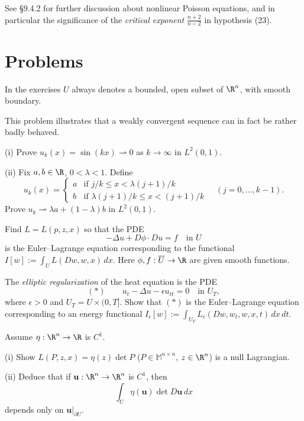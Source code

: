 See \S9.4.2 for further discussion about nonlinear Poisson equations, and in particular the significance of the \textit{critical exponent} $\frac{n+2}{n-2}$ in hypothesis (23).

\section{Problems}
\label{sec:calculus-of-variations-problems}

In the exercises $U$ always denotes a bounded, open subset of $\R^n$, with smooth boundary.

\begin{exercise}
This problem illustrates that a weakly convergent sequence can in fact be rather badly behaved.

(i) Prove $u_k(x) = \sin(kx) \rightharpoonup 0$ as $k \to \infty$ in $L^2(0,1)$.

(ii) Fix $a, b \in \R$, $0 < \lambda < 1$. Define
\[
u_k(x) = \begin{cases} a & \text{if } j/k \le x < \lambda(j+1)/k \\ b & \text{if } \lambda(j+1)/k \le x < (j+1)/k \end{cases} \quad (j = 0, \ldots, k-1).
\]
Prove $u_k \rightharpoonup \lambda a + (1-\lambda)b$ in $L^2(0,1)$.
\end{exercise}

\begin{exercise}
Find $L = L(p, z, x)$ so that the PDE
\[
-\Delta u + D\phi \cdot Du = f \quad \text{in } U
\]
is the Euler--Lagrange equation corresponding to the functional $I[w] := \int_U L(Dw, w, x)\, dx$. Here $\phi, f : \overline{U} \to \R$ are given smooth functions.
\end{exercise}

\begin{exercise}
The \textit{elliptic regularization} of the heat equation is the PDE
\[
(*) \qquad u_t - \Delta u - \epsilon u_{tt} = 0 \quad \text{in } U_T,
\]
where $\epsilon > 0$ and $U_T = U \times (0, T]$. Show that $(*)$ is the Euler--Lagrange equation corresponding to an energy functional $I_\epsilon[w] := \int_{U_T} L_\epsilon(Dw, w_t, w, x, t)\, dx\, dt$.
\end{exercise}

\begin{exercise}
Assume $\eta : \R^n \to \R$ is $C^1$.

(i) Show $L(P, z, x) = \eta(z) \det P$ ($P \in \mathbb{M}^{n \times n}$, $z \in \R^n$) is a null Lagrangian.

(ii) Deduce that if $\mathbf{u} : \R^n \to \R^n$ is $C^1$, then
\[
\int_U \eta(\mathbf{u}) \det D\mathbf{u}\, dx
\]
depends only on $\mathbf{u}|_{\partial U}$.
\end{exercise}

